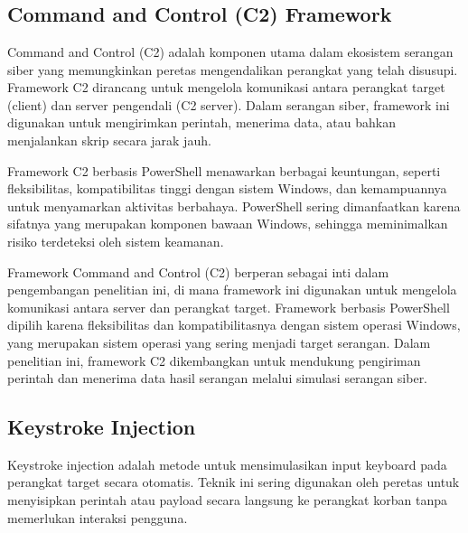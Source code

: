 \chapter{\babDua}

\section{Command and Control (C2) Framework}
Command and Control (C2) adalah komponen utama dalam ekosistem serangan siber yang memungkinkan peretas mengendalikan perangkat yang telah disusupi. Framework C2 dirancang untuk mengelola komunikasi antara perangkat target (client) dan server pengendali (C2 server). Dalam serangan siber, framework ini digunakan untuk mengirimkan perintah, menerima data, atau bahkan menjalankan skrip secara jarak jauh.


Framework C2 berbasis PowerShell menawarkan berbagai keuntungan, seperti fleksibilitas, kompatibilitas tinggi dengan sistem Windows, dan kemampuannya untuk menyamarkan aktivitas berbahaya. PowerShell sering dimanfaatkan karena sifatnya yang merupakan komponen bawaan Windows, sehingga meminimalkan risiko terdeteksi oleh sistem keamanan.


Framework Command and Control (C2) berperan sebagai inti dalam pengembangan penelitian ini, di mana framework ini digunakan untuk mengelola komunikasi antara server dan perangkat target. Framework berbasis PowerShell dipilih karena fleksibilitas dan kompatibilitasnya dengan sistem operasi Windows, yang merupakan sistem operasi yang sering menjadi target serangan. Dalam penelitian ini, framework C2 dikembangkan untuk mendukung pengiriman perintah dan menerima data hasil serangan melalui simulasi serangan siber. 

\section{Keystroke Injection}
Keystroke injection adalah metode untuk mensimulasikan input keyboard pada perangkat target secara otomatis. Teknik ini sering digunakan oleh peretas untuk menyisipkan perintah atau payload secara langsung ke perangkat korban tanpa memerlukan interaksi pengguna.


